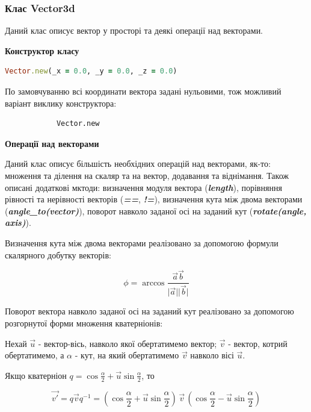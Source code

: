 \documentclass[simple,a4paper,14pt,ukrainian,utf8]{eskdtext}
\newcommand{\abs}[1]{\lvert#1\rvert} %
\begin{document}
    	\subsubsection{Клас Vector3d}

            Даний клас описує вектор у просторі та деякі операції над векторами.

            \textbf{Конструктор класу}

            \begin{lstlisting}[language=Ruby]
            Vector.new(_x = 0.0, _y = 0.0, _z = 0.0)
            \end{lstlisting}

            По замовчуванню всі координати вектора задані нульовими, тож можливий варіант виклику конструктора:

            \begin{lstlisting}
            Vector.new
            \end{lstlisting}

            \textbf{Операції над векторами}

            Даний клас описує більшість необхідних операцій над векторами, як-то: множення та ділення на скаляр та на вектор, додавання та віднімання. Також описані додаткові мктоди: визначення модуля вектора (\textit{\textbf{length}}), порівняння рівності та нерівності векторів (\textit{\textbf{==}}, \textit{\textbf{!=}}), визначення кута між двома векторами (\textit{\textbf{angle\_to(vector)}}), поворот навколо заданої осі на заданий кут (\textit{\textbf{rotate(angle, axis)}}).

            Визначення кута між двома векторами реалізовано за допомогою формули скалярного добутку векторів:

            $$ \phi = \arccos \frac{\vec{a}\vec{b}}{\abs{\vec{a}}\abs{\vec{b}}} $$

            Поворот вектора навколо заданої осі на заданий кут реалізовано за допомогою розгорнутої форми множення кватерніонів:


            Нехай $\vec{u}$ - вектор-вісь, навколо якої обертатимемо вектор; $\vec{v}$ - вектор, котрий обертатимемо, а $\alpha$ - кут, на який обертатимемо $\vec{v}$ навколо вісі $\vec{u}$.

            Якщо кватерніон $ q = \cos \frac{\alpha}{2} + \vec{u} \sin \frac{\alpha}{2} $, то

            $$ \vec{v'} = q \vec{v} q^{-1} = \left( \cos \frac{\alpha}{2} + \vec{u} \sin \frac{\alpha}{2} \right) \, \vec{v} \, \left( \cos \frac{\alpha}{2} - \vec{u} \sin \frac{\alpha}{2} \right) $$
\end{document}
